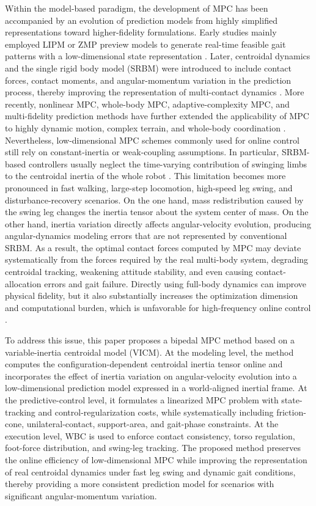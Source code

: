 \documentclass[5p,times]{elsarticle}
\begin{document}
Within the model-based paradigm, the development of MPC has been accompanied by an evolution of prediction models from highly simplified representations toward higher-fidelity formulations. Early studies mainly employed LIPM or ZMP preview models to generate real-time feasible gait patterns with a low-dimensional state representation \cite{ref17,ref18,ref19}. Later, centroidal dynamics and the single rigid body model (SRBM) were introduced to include contact forces, contact moments, and angular-momentum variation in the prediction process, thereby improving the representation of multi-contact dynamics \cite{ref25,ref44,ref49,ref50}. More recently, nonlinear MPC, whole-body MPC, adaptive-complexity MPC, and multi-fidelity prediction methods have further extended the applicability of MPC to highly dynamic motion, complex terrain, and whole-body coordination \cite{ref31,ref51,ref52,ref53,ref54,ref35,ref42,ref77}. Nevertheless, low-dimensional MPC schemes commonly used for online control still rely on constant-inertia or weak-coupling assumptions. In particular, SRBM-based controllers usually neglect the time-varying contribution of swinging limbs to the centroidal inertia of the whole robot \cite{ref29,ref39,ref40}. This limitation becomes more pronounced in fast walking, large-step locomotion, high-speed leg swing, and disturbance-recovery scenarios. On the one hand, mass redistribution caused by the swing leg changes the inertia tensor about the system center of mass. On the other hand, inertia variation directly affects angular-velocity evolution, producing angular-dynamics modeling errors that are not represented by conventional SRBM. As a result, the optimal contact forces computed by MPC may deviate systematically from the forces required by the real multi-body system, degrading centroidal tracking, weakening attitude stability, and even causing contact-allocation errors and gait failure. Directly using full-body dynamics can improve physical fidelity, but it also substantially increases the optimization dimension and computational burden, which is unfavorable for high-frequency online control \cite{ref77}.

To address this issue, this paper proposes a bipedal MPC method based on a variable-inertia centroidal model (VICM). At the modeling level, the method computes the configuration-dependent centroidal inertia tensor online and incorporates the effect of inertia variation on angular-velocity evolution into a low-dimensional prediction model expressed in a world-aligned inertial frame. At the predictive-control level, it formulates a linearized MPC problem with state-tracking and control-regularization costs, while systematically including friction-cone, unilateral-contact, support-area, and gait-phase constraints. At the execution level, WBC is used to enforce contact consistency, torso regulation, foot-force distribution, and swing-leg tracking. The proposed method preserves the online efficiency of low-dimensional MPC while improving the representation of real centroidal dynamics under fast leg swing and dynamic gait conditions, thereby providing a more consistent prediction model for scenarios with significant angular-momentum variation.
\end{document}
